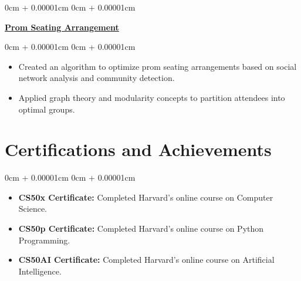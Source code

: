 \documentclass[10pt, letterpaper]{article}
\newenvironment{highlights}{
    \begin{itemize}[
        topsep=0.10cm,
        parsep=0.10cm,
        partopsep=0pt,
        itemsep=0pt,
        leftmargin=0cm + 10pt
    ]
}{
    \end{itemize}
}
\newenvironment{onecolentry}{
    \begin{adjustwidth}{
        0cm + 0.00001cm
    }{
        0cm + 0.00001cm
    }
}{
    \end{adjustwidth}
}
\newenvironment{twocolentry}[2][]{
    \onecolentry
    \def\secondColumn{#2}
    \setcolumnwidth{\fill, 5.5 cm} %
    \begin{paracol}{2}
}{
    \switchcolumn \raggedleft \secondColumn
    \end{paracol}
    \endonecolentry
}
\begin{document}
    \vspace{0.2cm}

    \begin{twocolentry}{}
        \textbf{\href{https://blucardin.github.io/projects/prom_seating/}{Prom Seating Arrangement}}
    \end{twocolentry}
    \vspace{0.10cm}
    \begin{onecolentry}
        \begin{highlights}
            \item Created an algorithm to optimize prom seating arrangements based on social network analysis and community detection.
            \item Applied graph theory and modularity concepts to partition attendees into optimal groups.
        \end{highlights}
    \end{onecolentry}

    \section{Certifications and Achievements}
    \begin{onecolentry}
        \begin{highlights}
            \item \textbf{CS50x Certificate:} Completed Harvard's online course on Computer Science.
            \item \textbf{CS50p Certificate:} Completed Harvard's online course on Python Programming.
            \item \textbf{CS50AI Certificate:} Completed Harvard's online course on Artificial Intelligence.
        \end{highlights}
    \end{onecolentry}
\end{document}
